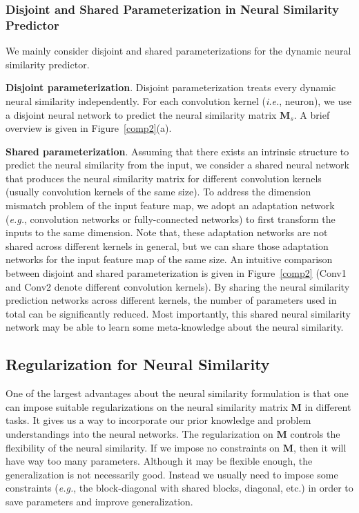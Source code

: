 \subsubsection{Disjoint and Shared Parameterization in Neural Similarity Predictor}

We mainly consider disjoint and shared parameterizations for the dynamic neural similarity predictor.

\textbf{Disjoint parameterization}. Disjoint parameterization treats every dynamic neural similarity independently. For each convolution kernel (\emph{i.e.}, neuron), we use a disjoint neural network to predict the neural similarity matrix $\bm{M}_s$. A brief overview is given in Figure~\ref{comp2}(a).
\par

\textbf{Shared parameterization}. Assuming that there exists an intrinsic structure to predict the neural similarity from the input, we consider a shared neural network that produces the neural similarity matrix for  different convolution kernels (usually convolution kernels of the same size). To address the dimension mismatch problem of the input feature map, we adopt an adaptation network (\emph{e.g.}, convolution networks or fully-connected networks) to first transform the inputs to the same dimension. Note that, these adaptation networks are not shared across different kernels in general, but we can share those adaptation networks for the input feature map of the same size. An intuitive comparison between disjoint and shared parameterization is given in Figure~\ref{comp2} (Conv1 and Conv2 denote different convolution kernels). By sharing the neural similarity prediction networks across different kernels, the number of parameters used in total can be significantly reduced. Most importantly, this shared neural similarity network may be able to learn some meta-knowledge about the neural similarity.

\subsection{Regularization for Neural Similarity}

One of the largest advantages about the neural similarity formulation is that one can impose suitable regularizations on the neural similarity matrix $\bm{M}$ in different tasks. It gives us a way to incorporate our prior knowledge and problem understandings into the neural networks. The regularization on $\bm{M}$ controls the flexibility of the neural similarity. If we impose no constraints on $\bm{M}$, then it will have way too many parameters. Although it may be flexible enough, the generalization is not necessarily good. Instead we usually need to impose some constraints (\emph{e.g.}, the block-diagonal with shared blocks, diagonal, etc.) in order to save parameters and improve generalization.
\par

